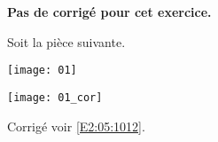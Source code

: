 \normaltrue \difficilefalse \tdifficilefalse
\correctionfalse


\setcounter{question}{0}

\ifcorrection
\else
\textbf{Pas de corrigé pour cet exercice.}
\fi


\ifprof 
\else
Soit la pièce suivante.
\begin{center}
\texttt{[image: 01]}
\end{center}
 \fi
 
\ifprof
\begin{center}
\texttt{[image: 01\_cor]}
\end{center}
\else 

\fi

\ifprof
\else
\begin{flushright}
\footnotesize{Corrigé  voir \ref{E2:05:1012}.}
\end{flushright}%
\fi